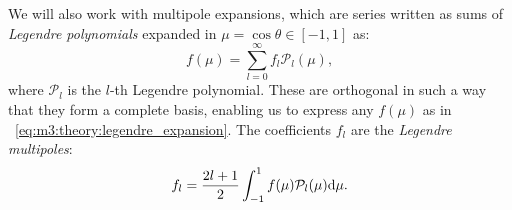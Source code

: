     We will also work with multipole expansions, which are series written as sums of \textit{Legendre polynomials} expanded in $\mu=\cos{\theta}\in[-1,1]$ as:
    \begin{equation}\label{eq:m3:theory:legendre_expansion}
        f(\mu) = \sum_{l=0}^{\infty}f_l\mathcal{P}_l(\mu),
    \end{equation}
    where $\mathcal{P}_l$ is the $l$-th Legendre polynomial. These are orthogonal in such a way that they form a complete basis, enabling us to express any $f(\mu)$ as in ~\cref{eq:m3:theory:legendre_expansion}. The coefficients $f_l$ are the \textit{Legendre multipoles}:
    \begin{equation}\label{eq:m3:theory:legendre_coeff}
        f_l = \frac{2l+1}{2}\int_{-1}^1f(\mu)\mathcal{P}_l(\mu)\mathrm{d}\mu.
    \end{equation}




